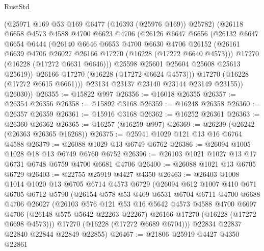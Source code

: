 \begin{lexlean}{RustStd}
\begin{coremodule}
              (@25971 @169 @53 @169 @6477 (@16393 (@25976 @169)) @25782)
              (@26118
                @6658
                @4573
                @4588
                @4700
                @6623
                @4706
                (@26126
                  @6647
                  @6656
                  (@26132
                    @6647
                    @6654
                    @6444
                    (@26140
                      @6646
                      @6653
                      @4700
                      @6630
                      @4706
                      @26152
                      (@26161 @6639 @4706 @26027 @26166 @17270 (@16228 (@17272 @6640 @4573)))
                      @17270
                      (@16228 (@17272 @6631 @6646)))
                    @25598
                    @25601
                    @25604
                    @25608
                    @25613
                    @25619))
                @26166
                @17270
                (@16228 (@17272 @6624 @4573)))
              @17270
              (@16228 (@17272 @6615 @6661)))
            @23134
            @23137
            @23140
            @23144
            @23149
            @23155))
        @26030))
@26355 := @15822 @997
@26356 := @16018 @26355
@26357 := @26354 @26356
@26358 := @15892 @3168
@26359 := @16248 @26358
@26360 := @26357 @26359
@26361 := @15916 @3168
@26362 := @16252 @26361
@26363 := @26360 @26362
@26365 := @16257 (@16259 @997)
@26369 := @26239 (@26242 (@26363 @26365 @16268))
@26375 := @25941 @1029 @121 @13 @16 @6764 @4588
@26379 := @26088 @1029 @13 @6749 @6762
@26386 := @26094 @1005 @1028 @18 @13 @6749 @6760 @6752
@26396 := @26103 @1021 @1027 @13 @17 @6731 @6748 @6759 @4700 @6681 @4706
@26400 := @26088 @1021 @13 @6705 @6729
@26403 := @22755 @25919 @4427 @4350
@26463 := @26403
    @1008
    @1014
    @1020
    @13
    @6705
    @6714
    @4573
    @6729
    (@26094
      @612
      @1007
      @410
      @671
      @6705
      @6712
      @5790
      (@26154
        @578
        @53
        @409
        @6531
        @6704
        @6711
        @4700
        @6688
        @4706
        @26027
        (@26103
          @576
          @121
          @53
          @16
          @5642
          @4573
          @4588
          @4700
          @6697
          @4706
          (@26148 @575 @5642 @22263 @22267)
          @26166
          @17270
          (@16228 (@17272 @6698 @4573)))
        @17270
        (@16228 (@17272 @6689 @6704)))
      @22834
      @22837
      @22840
      @22844
      @22849
      @22855)
@26467 := @21806 @25919 @4427 @4350 @22861

\end{coremodule}
\end{lexlean}
